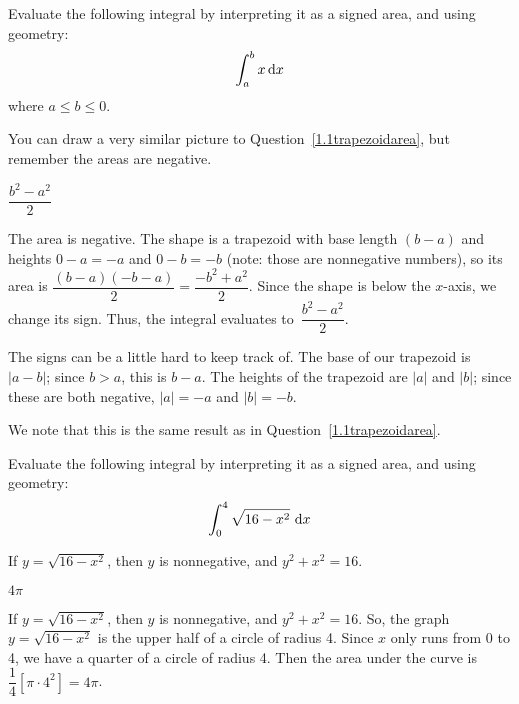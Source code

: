 \begin{question}
Evaluate the following integral by interpreting it as a signed area, and using geometry:
\[\int_a^b x\, \mathrm{d}x\]
where $a \leq b \leq 0$.
\end{question}
\begin{hint}
You can draw a very similar picture to Question~\ref{1.1trapezoidarea}, but remember the areas are negative.
\end{hint}
\begin{answer}
$\dfrac{b^2-a^2}{2}$
\end{answer}
\begin{solution}
The area is negative. The shape is a trapezoid with base length $(b - a)$ and heights
        $0-a=-a$ and $0-b=-b$ (note: those are nonnegative numbers), so its area is $\dfrac{(b-a)(-b-a)}{2}=\dfrac{-b^2+a^2}{2}$. Since the shape is below the $x$-axis, we change its sign. Thus, the integral evaluates to\ $\dfrac{b^2-a^2}{2}$.
\begin{center}
\end{center}

The signs can be a little hard to keep track of. The base of our trapezoid is $|a-b|$;  since $b>a$, this is $b-a$. The heights of the trapezoid are  $|a|$ and $|b|$; since these are both negative, $|a|=-a$ and $|b|=-b$.

We note that this is the same result as in Question~\ref{1.1trapezoidarea}.
\end{solution}


\begin{Mquestion}
Evaluate the following integral by interpreting it as a signed area, and using geometry:
\[\int_0^4 \sqrt{16-x^2} \ \mathrm{d}x\]
\end{Mquestion}
\begin{hint}
If $y=\sqrt{16-x^2}$, then $y$ is nonnegative, and $y^2+x^2=16$.
\end{hint}
\begin{answer}
$4\pi$
\end{answer}
\begin{solution}
If $y=\sqrt{16-x^2}$, then $y$ is nonnegative, and $y^2+x^2=16$. So, the graph $y=\sqrt{16-x^2}$ is the upper half of a circle of radius 4. Since $x$ only runs from 0 to 4, we have a quarter of a circle of radius 4. Then the area under the curve is $\dfrac{1}{4}\left[\pi\cdot 4^2\right]=4\pi$.
\begin{center}
\end{center}
\end{solution}



